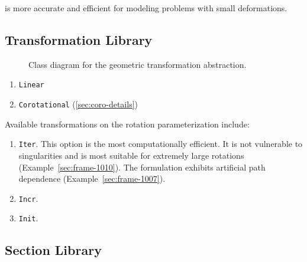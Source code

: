 

\ForceFrame{} is more accurate and efficient for modeling problems with small deformations. 


\subsection{Transformation Library}\label{sec:transformation-types}

\begin{figure}[H]
    \centering
    \resizebox{0.6\linewidth}{!}{}
    \caption{Class diagram for the geometric transformation abstraction.}
    \label{fig:frame-class}
\end{figure}

\begin{enumerate}
    \item\label{lib:T1} \texttt{Linear}
    \item\label{lib:T3} \texttt{Corotational} (\cref{sec:coro-details})
\end{enumerate}

Available transformations on the rotation parameterization include:
\begin{enumerate}
    \item \texttt{Iter}. This option is the most computationally efficient. 
    It is not vulnerable to singularities and is most suitable for extremely large rotations (Example~\ref{sec:frame-1010}). 
    The formulation exhibits artificial path dependence (Example~\cref{sec:frame-1007}).
    \item \texttt{Incr}. 
    \item \texttt{Init}.
\end{enumerate}

\subsection{Section Library}

